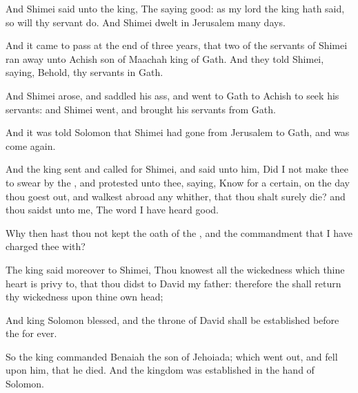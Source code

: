 {And
Shimei
said unto the
king, The
saying
{}
good: as my
lord the
king hath
said, so will thy
servant
do. And
Shimei
dwelt in
Jerusalem
many
days.

And it came to pass at the
end of
three
years, that
two of the
servants of
Shimei ran
away unto
Achish
son of
Maachah
king of
Gath. And they
told
Shimei,
saying, Behold, thy
servants
{} in
Gath.

And
Shimei
arose, and
saddled his
ass, and
went to
Gath to
Achish to
seek his
servants: and
Shimei
went, and
brought his
servants from
Gath.

And it was
told
Solomon that
Shimei had
gone from
Jerusalem to
Gath, and was come
again.

And the
king
sent and
called for
Shimei, and
said unto him, Did I not make thee to
swear by the
{}, and
protested unto thee,
saying,
Know for a
certain, on the
day thou goest
out, and
walkest abroad any
whither, that thou shalt
surely
die? and thou
saidst unto me, The
word
{} I have
heard
{}
good.

Why then hast thou not
kept the
oath of the
{}, and the
commandment that I have
charged thee with?

The
king
said moreover to
Shimei, Thou
knowest all the
wickedness which thine
heart is privy
to, that thou
didst to
David my
father: therefore the
{} shall
return thy
wickedness upon thine own
head;

And
king
Solomon
{}
blessed, and the
throne of
David shall be
established
before the
{}
for
ever.

So the
king
commanded
Benaiah the
son of
Jehoiada; which went
out, and
fell upon him, that he
died. And the
kingdom was
established in the
hand of
Solomon.




\par }
